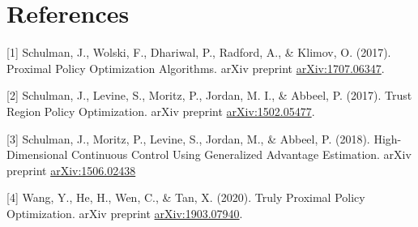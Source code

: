 \documentclass{article}
\begin{document}
\section*{References}


[1] Schulman, J., Wolski, F., Dhariwal, P., Radford, A., \& Klimov, O. (2017). Proximal Policy Optimization Algorithms. arXiv preprint \href{https://arxiv.org/abs/1707.06347}{arXiv:1707.06347}.

[2] Schulman, J., Levine, S., Moritz, P., Jordan, M. I., \& Abbeel, P. (2017). Trust Region Policy Optimization. arXiv preprint \href{https://arxiv.org/abs/1502.05477}{arXiv:1502.05477}.

[3] Schulman, J., Moritz, P., Levine, S., Jordan, M., \& Abbeel, P. (2018). High-Dimensional Continuous Control Using Generalized Advantage Estimation. arXiv preprint \href{https://arxiv.org/abs/1506.02438}{arXiv:1506.02438}

[4] Wang, Y., He, H., Wen, C., \& Tan, X. (2020). Truly Proximal Policy Optimization. arXiv preprint \href{https://arxiv.org/abs/1903.07940}{arXiv:1903.07940}.
\end{document}
